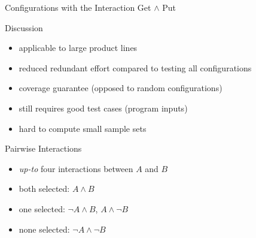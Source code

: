\begin{frame}{\insertsubsection}
\begin{fancycolumns}
\begin{example}{Configurations with the Interaction Get $\wedge$ Put}
{				
			}
		\end{example}
		\nextcolumn
		\begin{note}{Discussion}
			\begin{itemize}
				\item applicable to large product lines
				\item reduced redundant effort compared to testing all configurations
				\item coverage guarantee (opposed to random configurations)
				\item still requires good test cases (program inputs)
				\item hard to compute small sample sets
			\end{itemize}
		\end{note}
		\begin{definition}{Pairwise Interactions}
			\begin{itemize}
				\item \emph{up-to} four interactions between $A$ and $B$
				\item both selected: $A \wedge B$
				\item one selected: $\neg A \wedge B$, $A \wedge \neg B$
				\item none selected: $\neg A \wedge \neg B$
			\end{itemize}
		\end{definition}
	\end{fancycolumns}
\end{frame}

\newcommand{\pair}[2]{$#1 \wedge #2$ & $#1 \wedge \neg #2$ & $\neg #1 \wedge #2$ & $\neg #1 \wedge \neg #2$\\}
\newcommand{\redandgray}[1]{\only<#1-| handout:#1->{\color{black}}\only<#1| handout:#1>{\color{blue}}}
\newcommand{\epair}[6]{
	{\redandgray{#3}$#1 \wedge #2$} & 
	{\redandgray{#4}$#1 \wedge \neg #2$} & 
	{\redandgray{#5}$\neg #1 \wedge #2$} & 
	{\redandgray{#6}$\neg #1 \wedge \neg #2$}\\
}
\newcommand{\clepair}[6]{
	{$#1 \wedge #2$} & 
	{$#1 \wedge \neg #2$} & 
	{$\neg #1 \wedge #2$} & 
	{$\neg #1 \wedge \neg #2$}\\
}

